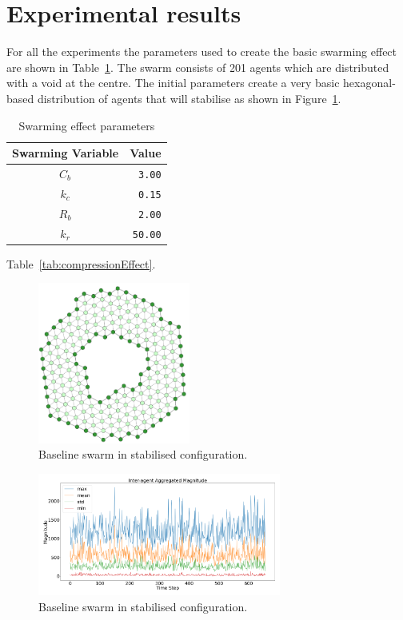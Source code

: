 \documentclass[12pt,a4paper]{IEEEtran}
\begin{document}
\section{Experimental results}
For all the experiments the parameters used to create the basic swarming effect are shown in Table~\ref{tab:swarmingEffect}. The swarm consists of 201 agents which are distributed with a void at the centre. The initial parameters create a very basic hexagonal-based distribution of agents that will stabilise as shown in Figure~\ref{fig:baselineSwarm}.  
 \begin{table}[h]
	\centering
	\tiny
	\begin{tabular}{|c|r|}
		\hline
		\rowcolor[HTML]{000000} 
		{\color[HTML]{FFFFFF} Swarming Variable} & {\color[HTML]{FFFFFF} Value} \\ \hline
		$C_b$ & \texttt{3.00} \\ \hline
		$k_c$ & \texttt{0.15}  \\ \hline
		$R_b$ & \texttt{2.00} \\ \hline
		$k_r$ & \texttt{50.00} \\ \hline
	\end{tabular}
  	\caption{Swarming effect parameters}
  	\label{tab:swarmingEffect}
\end{table}
Table~\ref{tab:compressionEffect}.
\begin{figure}[H]
	\begin{center}
		\includegraphics[width=5cm]{figures/exp1Start}
	\end{center}
	\caption{Baseline swarm in stabilised configuration. \label{fig:baselineSwarm}}
\end{figure}

\begin{figure}[H]
	\begin{center}
		\includegraphics[width=8cm]{figures/baselineSwarmMagnitude}
	\end{center}
	\caption{Baseline swarm in stabilised configuration. \label{fig:baselineSwarmMagnitude}}
\end{figure}
\end{document}
